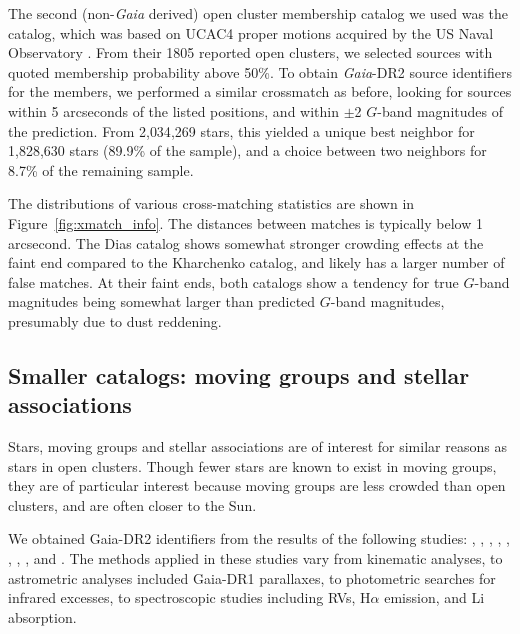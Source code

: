 \documentclass[12pt,twocolumn,tighten]{aastex62}
\begin{document}
The second (non-{\it Gaia} derived) open cluster membership catalog we
used was the \citet{dias_proper_2014} catalog, which was based on
UCAC4 proper motions acquired by the US Naval Observatory
\citep{zacharias_fourth_2013}.
From their 1805 reported open clusters, we selected sources with
quoted membership probability above 50\%.
To obtain {\it Gaia}-DR2 source identifiers for the members, we
performed a similar crossmatch as before, looking for sources within 5
arcseconds of the listed positions, and within $\pm$2 $G$-band
magnitudes of the prediction.
From 2{,}034{,}269 stars, this yielded a unique
best neighbor for 1{,}828{,}630 stars (89.9\% of the sample), and a choice
between two neighbors for 8.7\% of the remaining sample. 

The distributions of various cross-matching statistics are shown in
Figure~\ref{fig:xmatch_info}.  The distances between matches is
typically below 1 arcsecond.  The Dias catalog shows somewhat stronger
crowding effects at the faint end compared to the Kharchenko catalog,
and likely has a larger number of false matches.
At their faint ends, both catalogs show a tendency for true $G$-band
magnitudes being somewhat larger than predicted $G$-band magnitudes,
presumably due to dust reddening.


\subsection{Smaller catalogs: moving groups and stellar associations}
\label{subsec:mg}

Stars, moving groups and stellar associations are of interest for
similar reasons as stars in open clusters.  Though fewer stars
are known to exist in moving groups, they are of particular interest
because moving groups are less crowded than open clusters, and are
often closer to the Sun.

We obtained Gaia-DR2 identifiers from the results of the following
studies:
\citet{gagne_banyan_XI_2018},
\citet{gagne_banyan_XII_2018},
\citet{gagne_banyan_XIII_2018},
\citet{kraus_tucanahor_2014},
\citet{roser_deep_2011}, %
\citet{bell_32ori_2017},
\citet{rizzuto_multidimensional_2011},
\citet{oh_comoving_2017}, and
\citet{zari_3d_2018}. The methods applied in these studies
vary from kinematic analyses, to astrometric analyses included
Gaia-DR1 parallaxes, to photometric searches for infrared excesses, to
spectroscopic studies including RVs, H$\alpha$
emission, and Li absorption.
\end{document}
